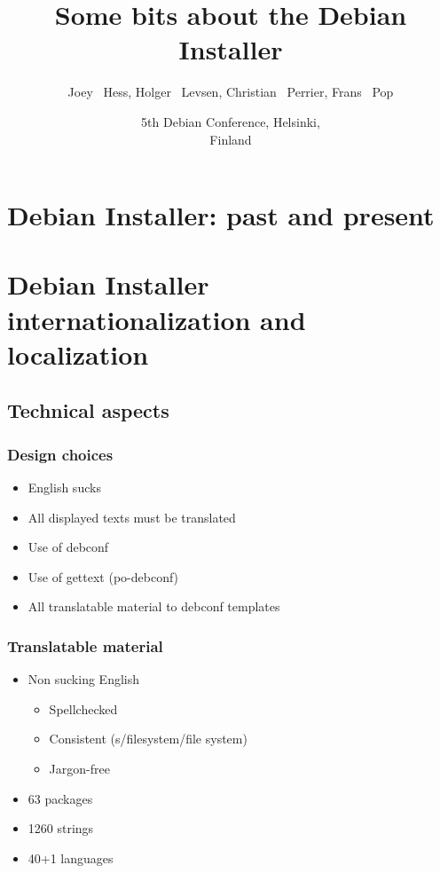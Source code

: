 \documentclass{beamer}
\title[Some bits about the Debian Installer] %
{Some bits about the Debian Installer}
\author[joeyh, h0lger, bubulle, fjp] %
{Joey ~Hess, Holger ~Levsen, Christian ~Perrier, Frans ~Pop}
\date[Debconf 5] %
{5th Debian Conference, Helsinki,\\ Finland}
\begin{document}
\begin{frame}
  \titlepage
\end{frame}


\section{Debian Installer: past and present}

\begin{frame}
  \frametitle{}
\end{frame}


\section{Debian Installer internationalization and localization}

\subsection{Technical aspects}

\begin{frame}
  \frametitle{Design choices}
	\begin{itemize}
	\item
		English sucks
	\item
		All displayed texts must be translated
	\item
		Use of debconf
	\item
		Use of gettext (po-debconf)
	\item
		All translatable material to debconf templates
	\end{itemize}
\end{frame}

\begin{frame}
  \frametitle{Translatable material}
	\begin{itemize}
	\item
		Non sucking English
		\begin{itemize}
			\item
				Spellchecked
			\item
				Consistent (s/filesystem/file system)
			\item
				Jargon-free
		\end{itemize}
	\item
		63 packages 
	\item
		1260 strings
	\item
		40+1 languages
	\end{itemize}
\end{frame}
\end{document}
